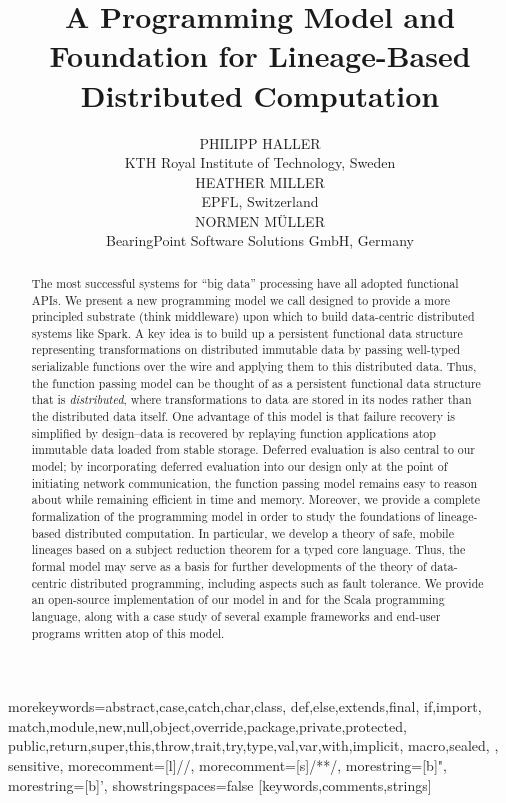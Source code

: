 \documentclass{jfp1}
\title[Journal of Functional Programming]{A Programming Model and Foundation for Lineage-Based Distributed Computation}
\author[P. Haller, H. Miller, and N. M{\"u}ller]{%
  PHILIPP HALLER\\ KTH Royal Institute of Technology, Sweden\\[1ex]%
  HEATHER MILLER\\ EPFL, Switzerland\\[1ex]%
  NORMEN M{\"U}LLER\\ BearingPoint Software Solutions GmbH, Germany}%
\begin{document}
%
{morekeywords={abstract,case,catch,char,class,%
    def,else,extends,final,%
    if,import,%
    match,module,new,null,object,override,package,private,protected,%
    public,return,super,this,throw,trait,try,type,val,var,with,implicit,%
    macro,sealed,%
  },%
  sensitive,%
  morecomment=[l]//,%
  morecomment=[s]{/*}{*/},%
  morestring=[b]",%
  morestring=[b]',%
  showstringspaces=false%
}[keywords,comments,strings]%

\setmonofont[Scale=0.8,BoldFont={Consolas Bold}]{Consolas}

\label{firstpage}

\maketitle

\begin{abstract}
  The most successful systems for ``big data'' processing have all
  adopted functional APIs. We present a new programming model we call
  {\FP} designed to provide a more principled substrate (think middleware) upon
  which to build data-centric distributed systems like Spark. A key idea is to build up a
  persistent functional data structure representing transformations on
  distributed immutable data by passing well-typed serializable
  functions over the wire and applying them to this distributed
  data. Thus, the function passing model can be thought of as a
  persistent functional data structure that is {\em distributed},
  where transformations to data are stored in its nodes rather than
  the distributed data itself. One advantage of this model is that failure recovery
  is simplified by design--data is recovered by replaying function applications atop
  immutable data loaded from stable storage. Deferred evaluation is
  also central to our model; by incorporating deferred evaluation into
  our design only at the point of initiating network communication,
  the function passing model remains easy to reason about while
  remaining efficient in time and memory. Moreover, we provide a
  complete formalization of the programming model in order to study
  the foundations of lineage-based distributed computation. In
  particular, we develop a theory of safe, mobile lineages based on a
  subject reduction theorem for a typed core language. Thus, the
  formal model may serve as a basis for further developments of the
  theory of data-centric distributed programming, including aspects
  such as fault tolerance. We provide an open-source implementation of
  our model in and for the Scala programming language, along with a
  case study of several example frameworks and end-user programs
  written atop of this model.
\end{abstract}
\end{document}
